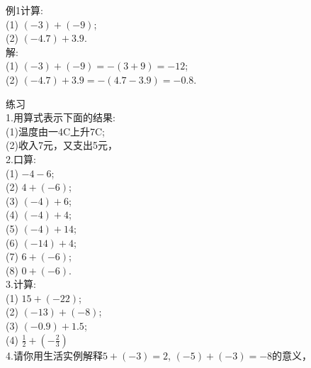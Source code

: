 \documentclass{article}
\begin{document}
\begin{example}
    
    例1计算:\\
    
    (1) $(-3)+(-9)$;\\
    
    (2) $(-4.7)+3.9$.\\
    
    解: \\
    (1) $(-3)+(-9)=-(3+9)=-12$;\\

    (2) $(-4.7)+3.9=-(4.7-3.9)=-0.8$.\\

\end{example}
    
\begin{exercise}
    
    练习\\
    
    1.用算式表示下面的结果:\\
    
    (1)温度由一4C上升7C;\\
    (2)收入7元，又支出5元，\\
    
    2.口算:\\

    (1) $-4-6$;\\
    
    (2) $4+(- 6)$;\\
    
    (3) $(-4)+6$;\\

    (4) $(-4)+4$;\\
    
    (5) $(-4)+14$;\\
    
    (6) $(-14)+4$;\\
    
    (7) $6+(-6)$;\\

    (8) $0+(-6)$.\\
    
    
    3.计算:\\

    (1) $15+(-22)$;\\
    
    (2) $(-13)+(-8)$;\\
    
    (3) $(-0.9)+1.5$;\\

    (4) $\frac{1}{2}+(-\frac{2}{3})$\\

    4.请你用生活实例解释$5+(-3)=2$, $(-5)+(-3)=-8$的意义，\\
    
\end{exercise}
\end{document}
